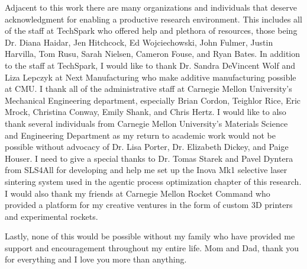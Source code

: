 \begin{acknowledgments}
Adjacent to this work there are many organizations and individuals that deserve
acknowledgment for enabling a productive research environment. This includes all
of the staff at TechSpark who offered help and plethora of resources, those
being Dr. Diana Haidar, Jen Hitchcock, Ed Wojciechowski, John Fulmer, Justin
Harvilla, Tom Rusu, Sarah Nielsen, Cameron Fouse, and Ryan Bates. In addition to
the staff at TechSpark, I would like to thank Dr. Sandra DeVincent Wolf and Liza
Lepczyk at Next Manufacturing who make additive manufacturing possible at CMU. I
thank all of the administrative staff at Carnegie Mellon University's Mechanical
Engineering department, especially Brian Cordon, Teighlor Rice, Eric Mrock,
Christina Conway, Emily Shank, and Chris Hertz. I would like to also thank
several individuals from Carnegie Mellon University's Materials Science and
Engineering Department as my return to academic work would not be possible
without advocacy of Dr. Lisa Porter, Dr. Elizabeth Dickey, and Paige Houser. I
need to give a special thanks to Dr. Tomas Starek and Pavel Dyntera from SLS4All
for developing and help me set up the Inova Mk1 selective laser sintering system
used in the agentic process optimization chapter of this research. I would also
thank my friends at Carnegie Mellon Rocket Command who provided a platform for
my creative ventures in the form of custom 3D printers and experimental rockets.

Lastly, none of this would be possible without my family who have provided me
support and encouragement throughout my entire life. Mom and Dad, thank you for
everything and I love you more than anything.

\end{acknowledgments}
